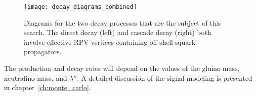 \begin{figure}[ht!]
    \centering
\texttt{[image: decay\_diagrams\_combined]}
\caption{Diagrams for the two decay processes that are the subject of this search. The direct decay (left) and cascade decay (right)
both involve effective RPV vertices containing off-shell squark propagators.}
\label{fig:susy_rpv_decays}
\end{figure}
The production and decay rates will depend on the values of the gluino mass, neutralino mass, and $\lambda''$.
A detailed discussion of the signal modeling is presented in chapter~\ref{ch:monte_carlo}.
